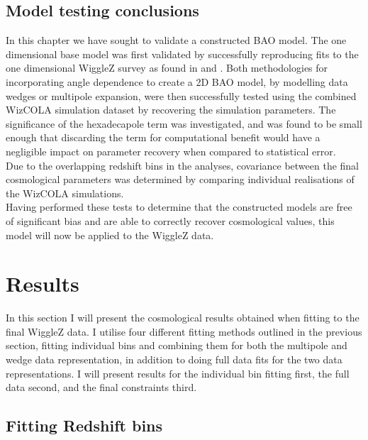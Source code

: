 \documentclass[titlesmallcaps, examinerscopy, copyrightpage]{uqthesis}
\begin{document}
\clearpage
\section{Model testing conclusions}

In this chapter we have sought to validate a constructed BAO model. The one dimensional base model was first validated by successfully reproducing fits to the one dimensional WiggleZ survey as found in \citet{BlakeDavis2011} and \citet{BlakeKazin2011}. Both methodologies for incorporating angle dependence to create a 2D BAO model, by modelling data wedges or multipole expansion, were then successfully tested using the combined WizCOLA simulation dataset by recovering the simulation parameters. The significance of the hexadecapole term was investigated, and was found to be small enough that discarding the term for computational benefit would have a negligible impact on parameter recovery when compared to statistical error.\\

Due to the overlapping redshift bins in the analyses, covariance between the final cosmological parameters was determined by comparing individual realisations of the WizCOLA simulations. \\

Having performed these tests to determine that the constructed models are free of significant bias and are able to correctly recover cosmological values, this model will now be applied to the WiggleZ data.













\chapter{Results}

In this section I will present the cosmological results obtained when fitting to the final WiggleZ data. I utilise four different fitting methods outlined in the previous section, fitting individual bins and combining them for both the multipole and wedge data representation, in addition to doing full data fits for the two data representations. I will present results for the individual bin fitting first, the full data second, and the final constraints third.



\section{Fitting Redshift bins}
\end{document}
